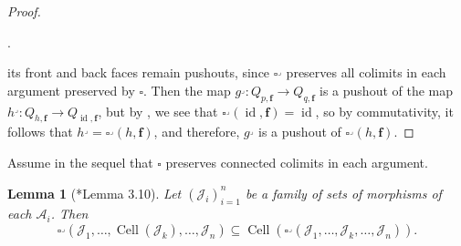 \documentclass[a4paper]{article}
\numberwithin{equation}{subsection}
\theoremstyle{plain}   %
\newtheorem{lemma}[equation]{Lemma}
\theoremstyle{definition}
\theoremstyle{remark}
\theoremstyle{plain}
\DeclareMathOperator{\id}{id}
\begin{document}
\begin{proof}
\begin{center}
.
	\end{center}	
	its front and back faces remain pushouts, since \(\square^\lrcorner\) preserves all colimits in each argument preserved by \(\square\).  Then the map \(g^\lrcorner: Q_{p,\mathbf{f}} \to Q_{q,\mathbf{f}}\)  is a pushout of the map \(h^\lrcorner:Q_{h,\mathbf{f}} \to Q_{\id,\mathbf{f}}\), but by , we see that \(\square^\lrcorner(\id,\mathbf{f})=\id\), so by commutativity, it follows that \(h^\lrcorner = \square^\lrcorner(h,\mathbf{f})\), and therefore, \(g^\lrcorner\) is a pushout of \(\square^\lrcorner(h,\mathbf{f})\).  
\end{proof}
Assume in the sequel that \(\square\) preserves connected colimits in each argument.
\begin{lemma}[\cite{oury}*{Lemma 3.10}]\label{cornertensorcell}
	Let \((\mathscr{J}_i)_{i=1}^n\) be a family of sets of morphisms of each \(\mathcal{A}_i\). Then 
	\[\square^\lrcorner(\mathscr{J}_1,\dots,\operatorname{Cell}(\mathscr{J}_k),\dots,\mathscr{J}_n) \subseteq \operatorname{Cell}(\square^\lrcorner(\mathscr{J}_1,\dots,\mathscr{J}_k,\dots,\mathscr{J}_n)).\]
\end{lemma}
\end{document}
